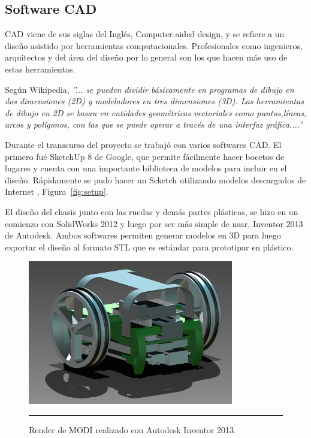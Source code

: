 \subsection{Software CAD}

CAD viene de sus siglas del Inglés, Computer-aided design, y se refiere a un diseño asistido por herramientas computacionales. Profesionales como ingenieros, arquitectos y del área del diseño por lo general son los que hacen más uso de estas herramientas.

Según Wikipedia, \textit{”... se pueden dividir básicamente en programas de dibujo en dos dimensiones (2D) y modeladores en tres dimensiones (3D). Las herramientas de dibujo en 2D se basan en entidades geométricas vectoriales como puntos,líneas, arcos y polígonos, con las que se puede operar a través de una interfaz gráfica....”}

Durante el transcurso del proyecto se trabajó con varios softwares CAD. El primero fué SketchUp 8 de Google, que permite fácilmente hacer bocetos de lugares y cuenta con una importante biblioteca de modelos para incluir en el diseño. Rápidamente se pudo hacer un Scketch utilizando modelos descargados de Internet , Figura~\ref{fig:setup}.

El diseño del chasis junto con las ruedas y demás partes plásticas, se hizo en un comienzo con SolidWorks 2012 y luego por ser más simple de usar, Inventor 2013 de Autodesk. Ambos softwares permiten generar modelos en 3D para luego exportar el diseño al formato STL que es estándar para prototipar en plástico.

\begin{figure}[htbp]
	\centering
		\includegraphics[width=0.8\textwidth]{./Figures/MODI/render2.png}
		\rule{35em}{0.5pt}
	\caption[Render]{Render de MODI realizado con Autodesk Inventor 2013.}
	\label{fig:render2}
\end{figure}	



